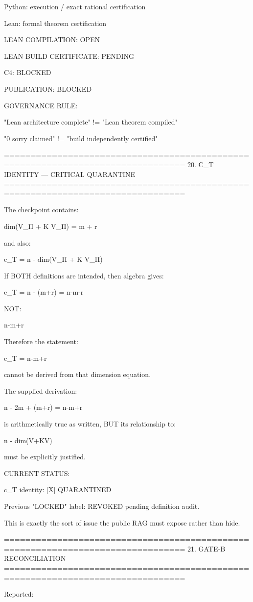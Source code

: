 Python:
execution / exact rational certification

Lean:
formal theorem certification

LEAN COMPILATION:
OPEN

LEAN BUILD CERTIFICATE:
PENDING

C4:
BLOCKED

PUBLICATION:
BLOCKED

GOVERNANCE RULE:

"Lean architecture complete" != "Lean theorem compiled"

"0 sorry claimed" != "build independently certified"

================================================================================
20. C_T IDENTITY — CRITICAL QUARANTINE
================================================================================

The checkpoint contains:

dim(V_Π + K V_Π) = m + r

and also:

c_T = n - dim(V_Π + K V_Π)

If BOTH definitions are intended, then algebra gives:

c_T
=
n - (m+r)
=
n-m-r

NOT:

n-m+r

Therefore the statement:

c_T = n-m+r

cannot be derived from that dimension equation.

The supplied derivation:

n - 2m + (m+r)
=
n-m+r

is arithmetically true as written,
BUT its relationship to:

n - dim(V+KV)

must be explicitly justified.

CURRENT STATUS:

c_T identity:
[X] QUARANTINED

Previous "LOCKED" label:
REVOKED pending definition audit.

This is exactly the sort of issue the public RAG must expose rather than
hide.

================================================================================
21. GATE-B RECONCILIATION
================================================================================

Reported:

